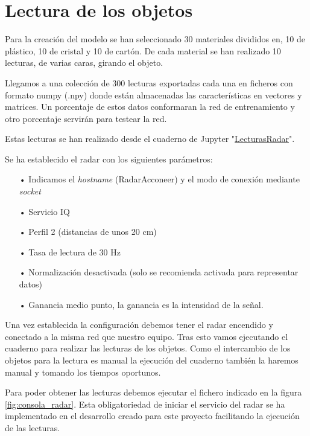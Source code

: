 \section{Lectura de los objetos}

Para la creación del modelo se han seleccionado 30 materiales divididos en, 10 de plástico, 10 de cristal y 10 de cartón. De cada material se han realizado 10 lecturas, de varias caras, girando el objeto.

Llegamos a una colección de 300 lecturas exportadas cada una en ficheros con formato numpy (.npy) donde están almacenadas las características en vectores y matrices. Un porcentaje de estos datos conformaran la red de entrenamiento y otro porcentaje servirán para testear la red.

Estas lecturas se han realizado desde el cuaderno de Jupyter "\href{https://github.com/mecyc/TFG_RADAR_60GHZ/scripts/LecturasRadar.ipynb}{LecturasRadar}".



Se ha establecido el radar con los siguientes parámetros:
\begin{itemize}
	\item[•]Indicamos el \textit{hostname} (RadarAcconeer) y el modo de conexión mediante \textit{socket}
	\item[•]Servicio IQ
	\item[•]Perfil 2 (distancias de unos 20 cm)
	\item[•]Tasa de lectura de 30 Hz
	\item[•]Normalización desactivada (solo se recomienda activada para representar datos)
	\item[•]Ganancia medio punto, la ganancia es la intensidad de la señal.
\end{itemize}

Una vez establecida la configuración debemos tener el radar encendido y conectado a la misma red que nuestro equipo. Tras esto vamos ejecutando el cuaderno para realizar las lecturas de los objetos. Como el intercambio de los objetos para la lectura es manual la ejecución del cuaderno también la haremos manual y tomando los tiempos oportunos.

Para poder obtener las lecturas debemos ejecutar el fichero indicado en la figura \ref{fig:consola_radar}. Esta obligatoriedad de iniciar el servicio del radar se ha implementado en el desarrollo creado para este proyecto facilitando la ejecución de las lecturas.



